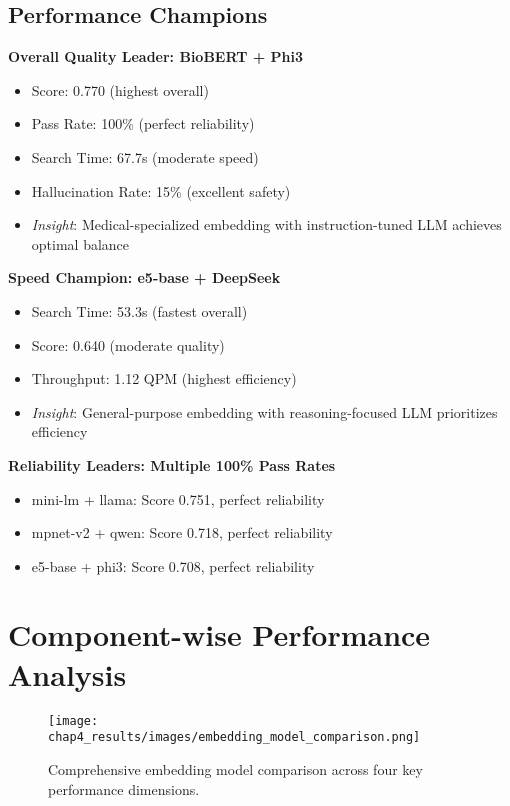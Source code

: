 \subsection{Performance Champions}

\textbf{Overall Quality Leader: BioBERT + Phi3}
\begin{itemize}
    \item Score: 0.770 (highest overall)
    \item Pass Rate: 100\% (perfect reliability)
    \item Search Time: 67.7s (moderate speed)
    \item Hallucination Rate: 15\% (excellent safety)
    \item \textit{Insight}: Medical-specialized embedding with instruction-tuned LLM achieves optimal balance
\end{itemize}

\textbf{Speed Champion: e5-base + DeepSeek}
\begin{itemize}
    \item Search Time: 53.3s (fastest overall)
    \item Score: 0.640 (moderate quality)
    \item Throughput: 1.12 QPM (highest efficiency)
    \item \textit{Insight}: General-purpose embedding with reasoning-focused LLM prioritizes efficiency
\end{itemize}

\textbf{Reliability Leaders: Multiple 100\% Pass Rates}
\begin{itemize}
    \item mini-lm + llama: Score 0.751, perfect reliability
    \item mpnet-v2 + qwen: Score 0.718, perfect reliability
    \item e5-base + phi3: Score 0.708, perfect reliability
\end{itemize}

\section{Component-wise Performance Analysis}



\begin{figure}[!htbp]
    \centering
    \texttt{[image: chap4\_results/images/embedding\_model\_comparison.png]}
    \caption{Comprehensive embedding model comparison across four key performance dimensions.}
    \label{fig:embedding_comparison}
\end{figure}

